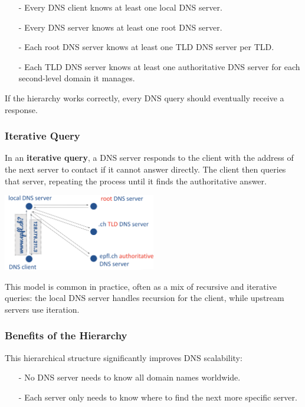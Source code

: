 \documentclass[../../compsys.tex]{subfiles}
\begin{document}
\begin{itemize}
    \item[-] Every DNS client knows at least one local DNS server.
    \item[-] Every DNS server knows at least one root DNS server.
    \item[-] Each root DNS server knows at least one TLD DNS server per TLD.
    \item[-] Each TLD DNS server knows at least one authoritative DNS server for each second-level domain it manages.
\end{itemize}
If the hierarchy works correctly, every DNS query should eventually receive a response.

\subsubsection{Iterative Query}
In an \textbf{iterative query}, a DNS server responds to the client with the address of the next server to contact if it cannot answer directly. The client then queries that server, repeating the process until it finds the authoritative answer.

\begin{center}
    \includegraphics[width=0.5\textwidth]{images/iterative.png}
\end{center}
This model is common in practice, often as a mix of recursive and iterative queries: the local DNS server handles recursion for the client, while upstream servers use iteration.

\subsubsection{Benefits of the Hierarchy}
This hierarchical structure significantly improves DNS scalability:
\begin{itemize}
    \item[-] No DNS server needs to know all domain names worldwide.
    \item[-] Each server only needs to know where to find the next more specific server.
\end{itemize}
\end{document}
